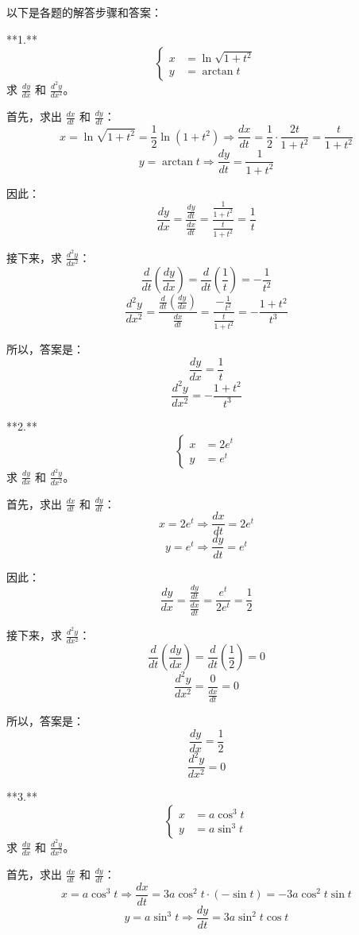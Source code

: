 以下是各题的解答步骤和答案：

**1.** \[ \left\{ \begin{aligned} x &= \ln \sqrt{1+t^2} \\ y &= \arctan t \end{aligned} \right. \]
求 \(\frac{dy}{dx}\) 和 \(\frac{d^2y}{dx^2}\)。

首先，求出 \(\frac{dx}{dt}\) 和 \(\frac{dy}{dt}\)：
\[ x = \ln \sqrt{1+t^2} = \frac{1}{2} \ln (1+t^2) \Rightarrow \frac{dx}{dt} = \frac{1}{2} \cdot \frac{2t}{1+t^2} = \frac{t}{1+t^2} \]
\[ y = \arctan t \Rightarrow \frac{dy}{dt} = \frac{1}{1+t^2} \]

因此：
\[ \frac{dy}{dx} = \frac{\frac{dy}{dt}}{\frac{dx}{dt}} = \frac{\frac{1}{1+t^2}}{\frac{t}{1+t^2}} = \frac{1}{t} \]

接下来，求 \(\frac{d^2y}{dx^2}\)：
\[ \frac{d}{dt}\left( \frac{dy}{dx} \right) = \frac{d}{dt}\left( \frac{1}{t} \right) = -\frac{1}{t^2} \]
\[ \frac{d^2y}{dx^2} = \frac{\frac{d}{dt}\left( \frac{dy}{dx} \right)}{\frac{dx}{dt}} = \frac{-\frac{1}{t^2}}{\frac{t}{1+t^2}} = -\frac{1+t^2}{t^3} \]

所以，答案是：
\[ \frac{dy}{dx} = \frac{1}{t} \]
\[ \frac{d^2y}{dx^2} = -\frac{1+t^2}{t^3} \]

**2.** \[ \left\{ \begin{aligned} x &= 2e^t \\ y &= e^t \end{aligned} \right. \]
求 \(\frac{dy}{dx}\) 和 \(\frac{d^2y}{dx^2}\)。

首先，求出 \(\frac{dx}{dt}\) 和 \(\frac{dy}{dt}\)：
\[ x = 2e^t \Rightarrow \frac{dx}{dt} = 2e^t \]
\[ y = e^t \Rightarrow \frac{dy}{dt} = e^t \]

因此：
\[ \frac{dy}{dx} = \frac{\frac{dy}{dt}}{\frac{dx}{dt}} = \frac{e^t}{2e^t} = \frac{1}{2} \]

接下来，求 \(\frac{d^2y}{dx^2}\)：
\[ \frac{d}{dt}\left( \frac{dy}{dx} \right) = \frac{d}{dt}\left( \frac{1}{2} \right) = 0 \]
\[ \frac{d^2y}{dx^2} = \frac{0}{\frac{dx}{dt}} = 0 \]

所以，答案是：
\[ \frac{dy}{dx} = \frac{1}{2} \]
\[ \frac{d^2y}{dx^2} = 0 \]

**3.** \[ \left\{ \begin{aligned} x &= a \cos^3 t \\ y &= a \sin^3 t \end{aligned} \right. \]
求 \(\frac{dy}{dx}\) 和 \(\frac{d^2y}{dx^2}\)。

首先，求出 \(\frac{dx}{dt}\) 和 \(\frac{dy}{dt}\)：
\[ x = a \cos^3 t \Rightarrow \frac{dx}{dt} = 3a \cos^2 t \cdot (-\sin t) = -3a \cos^2 t \sin t \]
\[ y = a \sin^3 t \Rightarrow \frac{dy}{dt} = 3a \sin^2 t \cos t \]

